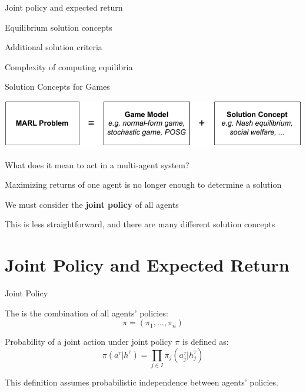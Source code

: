 

\leoslide

\subtitle{Solution Concepts for Games}


\maketitle

\introslide

\begin{frame}{\outline}

\blist
    \item Joint policy and expected return
    \item Equilibrium solution concepts
    \item Additional solution criteria 
    \item Complexity of computing equilibria
\elist
    
\end{frame}

\begin{frame}{Solution Concepts for Games}
	\begin{center}
        \includegraphics{images/chapter_4/marl-learning-problem.pdf}
   	\end{center}
    	
    What does it mean to act  in a multi-agent system?

    \blist
        \item Maximizing returns of one agent is no longer enough to determine a solution
        \item We must consider the {\bf joint policy} of all agents
        \item This is less straightforward, and there are many different solution concepts
    \elist
    
\end{frame}

\section[t]{Joint Policy and Expected Return}

\begin{frame}{Joint Policy}

    The  is the combination of all agents' policies:
    $$\pi = (\pi_1, ..., \pi_n)$$

    Probability of a joint action under joint policy $\pi$ is defined as:
    $$\pi(a^{\tau}|h^{\tau}) = \prod_{j \in I}\pi_{j}(a_{j}^\tau | h^{\tau}_j)$$

    \begin{notebox}
        This definition assumes probabilistic independence between agents' policies. 
    \end{notebox}

\end{frame}

